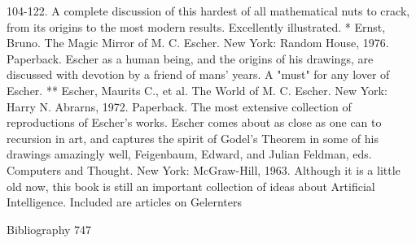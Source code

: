   104-122. A complete discussion of this hardest of all mathematical nuts to crack, from
         its origins to the most modern results. Excellently illustrated.
* Ernst, Bruno. The Magic Mirror of M. C. Escher. New York: Random House, 1976.
  Paperback. Escher as a human being, and the origins of his drawings, are discussed
  with devotion by a friend of mans' years. A "must" for any lover of Escher.
** Escher, Maurits C., et al. The World of M. C. Escher. New York: Harry N. Abrarns,
1972. Paperback. The most extensive collection of reproductions of Escher's works.
  Escher comes about as close as one can to recursion in art, and captures the spirit of
  Godel's Theorem in some of his drawings amazingly well,
Feigenbaum, Edward, and Julian Feldman, eds. Computers and Thought. New York:
  McGraw-Hill, 1963. Although it is a little old now, this book is still an important
  collection of ideas about Artificial Intelligence. Included are articles on Gelernters

Bibliography                                                                          747


